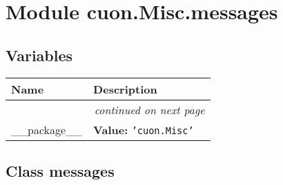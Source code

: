 %
%
%


\section{Module cuon.Misc.messages}

    \label{cuon:Misc:messages}


  \subsection{Variables}

    \vspace{-1cm}
\hspace{\varindent}\begin{longtable}{|p{\varnamewidth}|p{\vardescrwidth}|l}
\cline{1-2}
\cline{1-2} \centering \textbf{Name} & \centering \textbf{Description}& \\
\cline{1-2}
\endhead\cline{1-2}\multicolumn{3}{r}{\small\textit{continued on next page}}\\\endfoot\cline{1-2}
\endlastfoot\raggedright \_\-\_\-p\-a\-c\-k\-a\-g\-e\-\_\-\_\- & \raggedright \textbf{Value:} 
{\tt \texttt{'}\texttt{cuon.Misc}\texttt{'}}&\\
\cline{1-2}
\end{longtable}



\subsection{Class messages}

